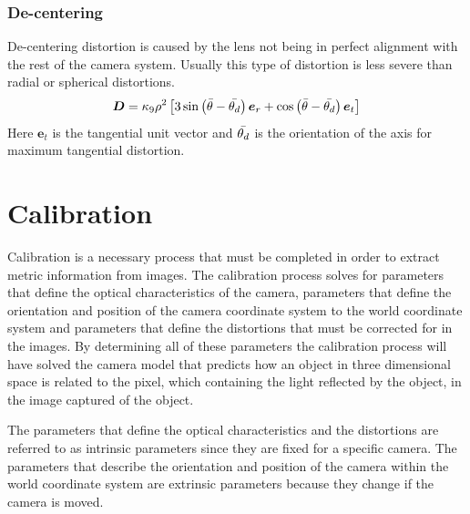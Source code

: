 \documentclass[[12pt,oneside,openany,a4paper, %
\newcommand*\mean[1]{\bar{#1}} %
\begin{document}
\subsection{De-centering}
De-centering distortion is caused by the lens not being in perfect alignment with the rest of the camera system. Usually this type of distortion is less severe than radial or spherical distortions.
\begin{equation}
  \bm{D} = \kappa_9 \rho^2 \left[ 3 \sin \left( \mean{\theta} - \mean{\theta_d} \right) \bm{e}_r + \cos \left( \mean{\theta} - \mean{\theta_d} \right) \bm{e}_t \right]
\end{equation}
Here $\bm{e}_t$ is the tangential unit vector and $\mean{\theta_d}$ is the orientation of the axis for maximum tangential distortion.


















\chapter{Calibration}
Calibration is a necessary process that must be completed in order to extract metric information from images. The calibration process solves for parameters that define the optical characteristics of the camera, parameters that define the orientation and position of the camera coordinate system to the world coordinate system and parameters that define the distortions that must be corrected for in the images. By determining all of these parameters the calibration process will have solved the camera model that predicts how an object in three dimensional space is related to the pixel, which containing the light reflected by the object, in the image captured of the object.

The parameters that define the optical characteristics and the distortions are referred to as intrinsic parameters since they are fixed for a specific camera. The parameters that describe the orientation and position of the camera within the world coordinate system are extrinsic parameters because they change if the camera is moved. 
\end{document}

